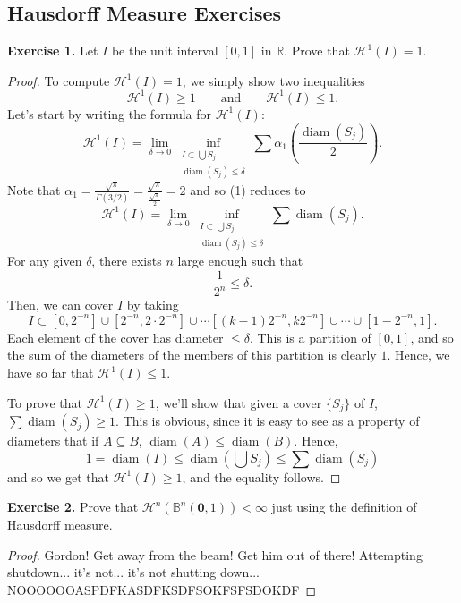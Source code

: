 \documentclass[10pt]{article}
\theoremstyle{plain}
\DeclareMathOperator{\diam}{diam}
\begin{document}
\subsection*{Hausdorff Measure Exercises}
	\noindent \textbf{Exercise 1.} Let $I$ be the unit interval $[0, 1]$ in $\mathbb{R}$. Prove that $\mathcal{H}^1(I) = 1$. 
		\begin{proof}
			To compute $\mathcal{H}^1(I) = 1$, we simply show two inequalities $$\mathcal{H}^1(I) \geq 1 \qquad \text{and} \qquad \mathcal{H}^1(I) \leq 1.$$ Let's start by writing the formula for $\mathcal{H}^1(I)$: \begin{equation} \mathcal{H}^1(I) = \lim_{\delta \to 0} \inf_{\substack{I \subset \bigcup S_j \\ \diam(S_j) \leq \delta}} \sum \alpha_1 \left(\frac{\diam(S_j)}{2}\right). \end{equation} 
		Note that $\alpha_1 = \frac{\sqrt{\pi}}{\Gamma(3/2)} = \frac{\sqrt{\pi}}{\frac{\sqrt{\pi}}{2}} = 2$ and so (1) reduces to $$\mathcal{H}^1(I) = \lim_{\delta \to 0} \inf_{\substack{I \subset \bigcup S_j \\ \diam(S_j) \leq \delta}} \sum \diam(S_j).$$ For any given $\delta$, there exists $n$ large enough such that $$\frac{1}{2^n} \leq \delta.$$ Then, we can cover $I$ by taking $$I \subset [0, 2^{-n}] \cup [2^{-n}, 2 \cdot 2^{-n}] \cup \cdots [(k - 1)2^{-n}, k 2^{-n}] \cup \cdots \cup [1 - 2^{-n}, 1].$$ Each element of the cover has diameter $\leq \delta$. This is a partition of $[0, 1]$, and so the sum of the diameters of the members of this partition is clearly $1$. Hence, we have so far that $\mathcal{H}^1(I) \leq 1$. 
		
		
		
		To prove that $\mathcal{H}^1(I) \geq 1$, we'll show that given a cover $\{S_j\}$ of $I$, $\sum \diam(S_j) \geq 1$. This is obvious, since it is easy to see as a property of diameters that if $A \subseteq B$, $\diam(A) \leq \diam(B)$. Hence, $$1 = \diam(I) \leq \diam\left(\bigcup S_j\right) \leq \sum \diam(S_j)$$ and so we get that $\mathcal{H}^1(I) \geq 1$, and the equality follows. 
		\end{proof}
	
	\noindent \textbf{Exercise 2.} Prove that $\mathcal{H}^n(\mathbb{B}^n(\mathbf{0}, 1)) < \infty$ just using the definition of Hausdorff measure.
		\begin{proof}
			Gordon! Get away from the beam! Get him out of there! Attempting shutdown... it's not... it's not shutting down... NOOOOOOASPDFKASDFKSDFSOKFSFSDOKDF
		\end{proof}
	
\end{document}
